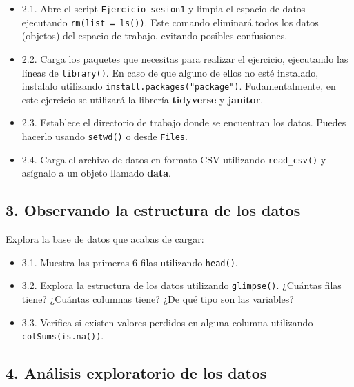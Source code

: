 \documentclass[
]{article}
\providecommand{\tightlist}{%
  \setlength{\itemsep}{0pt}\setlength{\parskip}{0pt}}
\begin{document}
\begin{itemize}
\item
  2.1. Abre el script \texttt{Ejercicio\_sesion1} y limpia el espacio de
  datos ejecutando \texttt{rm(list\ =\ ls())}. Este comando eliminará
  todos los datos (objetos) del espacio de trabajo, evitando posibles
  confusiones.
\item
  2.2. Carga los paquetes que necesitas para realizar el ejercicio,
  ejecutando las líneas de \texttt{library()}. En caso de que alguno de
  ellos no esté instalado, instalalo utilizando
  \texttt{install.packages("package")}. Fudamentalmente, en este
  ejercicio se utilizará la librería \textbf{tidyverse} y
  \textbf{janitor}.
\item
  2.3. Establece el directorio de trabajo donde se encuentran los datos.
  Puedes hacerlo usando \texttt{setwd()} o desde \texttt{Files}.
\item
  2.4. Carga el archivo de datos en formato CSV utilizando
  \texttt{read\_csv()} y asígnalo a un objeto llamado \textbf{data}.
\end{itemize}

\hypertarget{observando-la-estructura-de-los-datos}{%
\subsection{3. Observando la estructura de los
datos}\label{observando-la-estructura-de-los-datos}}

Explora la base de datos que acabas de cargar:

\begin{itemize}
\tightlist
\item
  3.1. Muestra las primeras 6 filas utilizando \texttt{head()}.
\item
  3.2. Explora la estructura de los datos utilizando \texttt{glimpse()}.
  ¿Cuántas filas tiene? ¿Cuántas columnas tiene? ¿De qué tipo son las
  variables?
\item
  3.3. Verifica si existen valores perdidos en alguna columna utilizando
  \texttt{colSums(is.na())}.
\end{itemize}

\hypertarget{anuxe1lisis-exploratorio-de-los-datos}{%
\subsection{4. Análisis exploratorio de los
datos}\label{anuxe1lisis-exploratorio-de-los-datos}}
\end{document}
